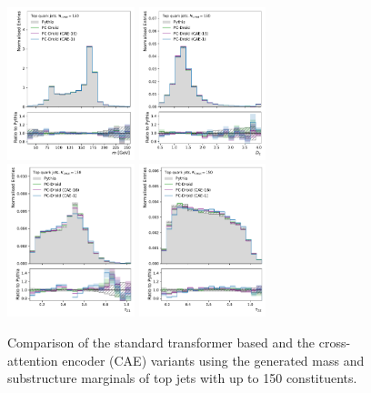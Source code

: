 \begin{figure}[tb]
    \centering
    \includegraphics[width=0.33\textwidth]{Figures/jet_generation/droid/150/hlvs/t/100/mass.pdf}
    \includegraphics[width=0.33\textwidth]{Figures/jet_generation/droid/150/hlvs/t/100/d2.pdf} \\
    \includegraphics[width=0.33\textwidth]{Figures/jet_generation/droid/150/hlvs/t/100/tau_21.pdf}
    \includegraphics[width=0.33\textwidth]{Figures/jet_generation/droid/150/hlvs/t/100/tau_32.pdf}
    \caption{
        Comparison of the standard transformer based \pcdroid and the cross-attention encoder (CAE) variants using the generated mass and substructure marginals of top jets with up to 150 constituents.
    }
    \label{fig:hlvs-150-marginals}
\end{figure}

